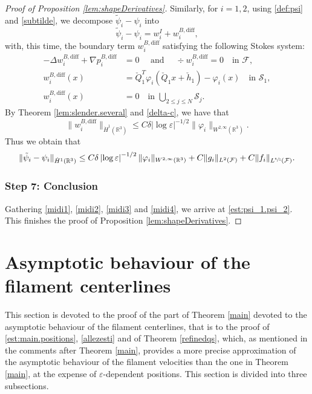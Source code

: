 \documentclass[11pt]{article}
\providecommand{\widecheck}{\check}
\newcommand{\R}{\mathbb{R}}
\let\eps\varepsilon
\theoremstyle{definition}
\theoremstyle{remark}
\begin{document}
\begin{proof}[Proof of Proposition \ref{lem:shapeDerivatives}]
Similarly, for $i=1,2$, using \eqref{def:psi} and \eqref{subtilde}, we decompose $\tilde \psi_i - \psi_i$ into
\[
\tilde \psi_i - \psi_i = w_i^I + w_i^{B,\textrm{diff}},\]
with, this time, the boundary term $w_i^{B,\textrm{diff}}$ satisfying the following Stokes system:
\begin{align*}
- \Delta w_i^{B,\textrm{diff}} + \nabla p_i^{B,\textrm{diff}} &= 0 \quad \text{ and } \quad\div w_i^{B,\textrm{diff}} = 0 \quad \text{in } \mathcal F, \\
w_i^{B,\textrm{diff}}(x) &= \widecheck Q_1^T \varphi_i(\widecheck Q_1 x + \widecheck h_1) - \varphi_i(x) \quad \text{in } \mathcal S_1, \\
w_i^{B,\textrm{diff}}(x) &= 0 \quad \text{in } \bigcup_{2 \leq j \leq N} \mathcal S_j.
\end{align*}
By Theorem \ref{lem:slender.several} and \eqref{delta-c},
we have that
\begin{equation*}
\|w_i^{B,\textrm{diff}}\|_{\dot H^1(\R^3)} \leq C \delta \left|\log \eps\right|^{-1/2} \| \varphi_i\|_{W^{2,\infty} (\R^3)}.
\end{equation*}
Thus
we obtain that
\begin{equation}
\label{midi3}
\|\tilde \psi_i - \psi_i\|_{\dot H^1(\R^3)} \leq C \delta \left|\log \eps\right|^{-1/2}\| \varphi_i\|_{W^{2,\infty} (\R^3)} + C \|g_i\|_{L^2 (\mathcal F)} + C \|f_i\|_{L^{\sfrac 6 5 } (\mathcal F)}.
\end{equation}

\subsubsection*{Step 7: Conclusion} Gathering \eqref{midi1}, \eqref{midi2},
\eqref{midi3} and \eqref{midi4}, we arrive at \eqref{est:psi_1.psi_2}.
This finishes the proof of Proposition \ref{lem:shapeDerivatives}.
\end{proof}

\section{Asymptotic behaviour of the filament centerlines}
\label{gathered-section}
This section is devoted to the proof of the part of Theorem \ref{main} devoted to the asymptotic behaviour of the filament centerlines, that is to the proof of
\eqref{est:main.positions},
\eqref{allezesti} and of
Theorem \ref{refinedqs}, which, as mentioned in the comments after Theorem \ref{main},
provides a more precise approximation of the asymptotic behaviour of the filament velocities than the one in Theorem \ref{main}, at the expense of $\eps$-dependent positions.
This section is divided into three subsections.
\end{document}
